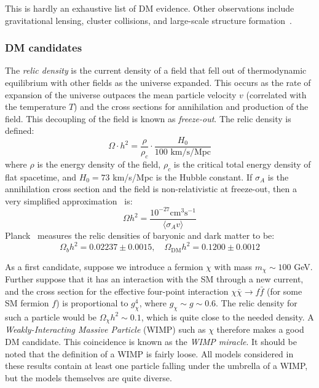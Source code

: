 This is hardly an exhaustive list of DM evidence.
Other observations include gravitational lensing, cluster collisions, and large-scale structure formation~\cite{dm1,dm2}.

\subsubsection{DM candidates}

The \emph{relic density} is the current density of a field that fell out of thermodynamic equilibrium with other fields as the universe expanded.
This occurs as the rate of expansion of the universe outpaces the mean particle velocity ${v}$ (correlated with the temperature ${T}$) and the cross sections for annihilation and production of the field.
This decoupling of the field is known as \emph{freeze-out}.
The relic density is defined:
\begin{equation}
    \Omega \cdot h^2 = \frac{\rho}{\rho_c} \cdot \frac{H_0}{100\text{ km/s/Mpc}}
\end{equation}
where ${\rho}$ is the energy density of the field, ${\rho_c}$ is the critical total energy density of flat spacetime, and ${H_0=73}$ km/s/Mpc is the Hubble constant.
If ${\sigma_A}$ is the annihilation cross section and the field is non-relativistic at freeze-out, then a very simplified approximation~\cite{dm1} is:
\begin{equation}
    \Omega h^2 = \frac{10^{-27}\mathrm{cm}^3\mathrm{s}^{-1}}{\langle \sigma_A v\rangle}
    \label{eq:theory:relic}
\end{equation}
Planck~\cite{planck} measures the relic densities of baryonic and dark matter to be:
\begin{equation}
    \Omega_b h^2 = 0.02237 \pm 0.0015, \quad \Omega_\mathrm{DM} h^2 = 0.1200 \pm 0.0012
\end{equation}

As a first candidate, suppose we introduce a fermion ${\chi}$ with mass ${m_\chi\sim100}$ GeV.
Further suppose that it has an interaction with the SM through a new current, and the cross section for the effective four-point interaction ${\chi \bar\chi\rightarrow f\bar f}$ (for some SM fermion ${f}$) is proportional to ${g^4_\chi}$, where ${g_\chi \sim g \sim 0.6}$.
The relic density for such a particle would be ${\Omega_\chi h^2 \sim 0.1}$, which is quite close to the needed density.
A \emph{Weakly-Interacting Massive Particle} (WIMP) such as ${\chi}$ therefore makes a good DM candidate.
This coincidence is known as the \emph{WIMP miracle}.
It should be noted that the definition of a WIMP is fairly loose.
All models considered in these results contain at least one particle falling under the umbrella of a WIMP, but the models themselves are quite diverse.

